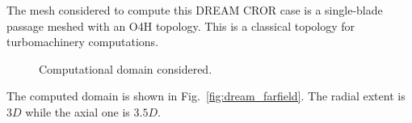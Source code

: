 
The mesh considered to compute this
DREAM CROR case is a single-blade passage meshed
with an O4H topology. This is a classical
topology for turbomachinery computations.
\begin{figure}[htb]
  \centering
  \caption{Computational domain considered.}
  \label{fig:dream_wall}
\end{figure}
The computed domain is shown in Fig.~\ref{fig:dream_farfield}.
The radial extent is $3D$ while the axial one is $3.5D$.